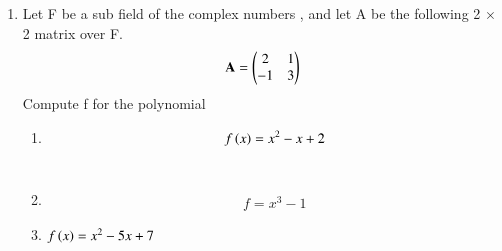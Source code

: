 \renewcommand{\theequation}{\theenumi}
\renewcommand{\thefigure}{\theenumi}
\begin{enumerate}[label=\thesubsection.\arabic*.,ref=\thesubsection.\theenumi]

\item Let F be a sub field of the complex numbers , and let A be the following 2 $\times$ 2 matrix over F.
\begin{align}
  \mathbf{A}=\begin{pmatrix}2&1\\-1&3\end{pmatrix}  
\end{align}
Compute f for the polynomial
\begin{enumerate}
\item 
\begin{align}
    f\left(x\right)=x^{2}-x+2
\end{align}
%
\\
\solution

\item
\begin{align}
f = x^3 - 1
\end{align}
\solution

%
\item 
$f\left(x\right)=x^{2}-5x+7$
%
\\
\solution

\end{enumerate}
\end{enumerate}
